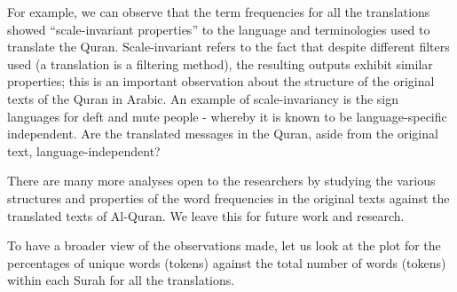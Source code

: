 \documentclass[
]{article}
\newenvironment{Shaded}{\begin{snugshade}}{\end{snugshade}}
\newcommand{\AttributeTok}[1]{\textcolor[rgb]{0.13,0.29,0.53}{#1}}
\newcommand{\DecValTok}[1]{\textcolor[rgb]{0.00,0.00,0.81}{#1}}
\newcommand{\FunctionTok}[1]{\textcolor[rgb]{0.13,0.29,0.53}{\textbf{#1}}}
\newcommand{\NormalTok}[1]{#1}
\newcommand{\OtherTok}[1]{\textcolor[rgb]{0.56,0.35,0.01}{#1}}
\newcommand{\SpecialCharTok}[1]{\textcolor[rgb]{0.81,0.36,0.00}{\textbf{#1}}}
\newcommand{\StringTok}[1]{\textcolor[rgb]{0.31,0.60,0.02}{#1}}
\begin{document}
For example, we can observe that the term frequencies for all the translations showed ``scale-invariant properties'' to the language and terminologies used to translate the Quran. Scale-invariant refers to the fact that despite different filters used (a translation is a filtering method), the resulting outputs exhibit similar properties; this is an important observation about the structure of the original texts of the Quran in Arabic. An example of scale-invariancy is the sign languages for deft and mute people - whereby it is known to be language-specific independent. Are the translated messages in the Quran, aside from the original text, language-independent?

There are many more analyses open to the researchers by studying the various structures and properties of the word frequencies in the original texts against the translated texts of Al-Quran. We leave this for future work and research.

To have a broader view of the observations made, let us look at the plot for the percentages of unique words (tokens) against the total number of words (tokens) within each Surah for all the translations.

\begin{Shaded}
\end{Shaded}
\end{document}
